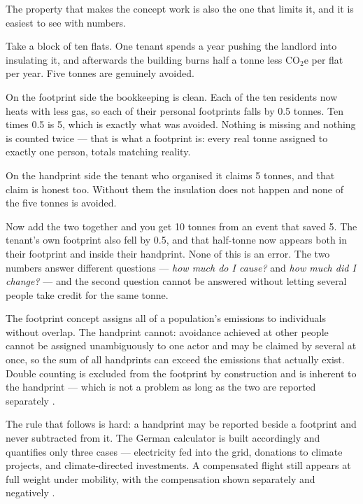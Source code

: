 \documentclass[11pt,a4paper]{article}
\begin{document}
The property that makes the concept work is also the one that limits it, and it is
easiest to see with numbers.

Take a block of ten flats. One tenant spends a year pushing the landlord into
insulating it, and afterwards the building burns half a tonne less CO$_2$e per flat
per year. Five tonnes are genuinely avoided.

On the footprint side the bookkeeping is clean. Each of the ten residents now heats
with less gas, so each of their personal footprints falls by 0.5 tonnes. Ten times
0.5 is 5, which is exactly what was avoided. Nothing is missing and nothing is
counted twice — that is what a footprint is: every real tonne assigned to exactly one
person, totals matching reality.

On the handprint side the tenant who organised it claims 5 tonnes, and that claim is
honest too. Without them the insulation does not happen and none of the five tonnes
is avoided.

Now add the two together and you get 10 tonnes from an event that saved 5. The
tenant's own footprint also fell by 0.5, and that half-tonne now appears both in
their footprint and inside their handprint. None of this is an error. The two numbers
answer different questions — \emph{how much do I cause?} and \emph{how much did I
change?} — and the second question cannot be answered without letting several people
take credit for the same tonne.

\begin{keybox}
The footprint concept assigns all of a population's emissions to individuals without
overlap. The handprint cannot: avoidance achieved at other people cannot be assigned
unambiguously to one actor and may be claimed by several at once, so the sum of all
handprints can exceed the emissions that actually exist. Double counting is excluded
from the footprint by construction and is inherent to the handprint — which is not a
problem as long as the two are reported separately \cite{uba-rechner}.
\end{keybox}

The rule that follows is hard: a handprint may be reported beside a footprint and
never subtracted from it. The German calculator is built accordingly and quantifies
only three cases — electricity fed into the grid, donations to climate projects, and
climate-directed investments. A compensated flight still appears at full weight under
mobility, with the compensation shown separately and negatively \cite{uba-rechner}.
\end{document}
